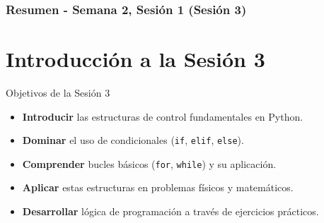 \documentclass[10pt]{beamer}
\begin{document}
\myfront{}

\begin{frame}[plain]
  \titlepage
\end{frame}

\begin{frame}
  \frametitle{Resumen - Semana 2, Sesión 1 (Sesión 3)}
  \tableofcontents
\end{frame}


\section{Introducción a la Sesión 3}

\begin{frame}{Objetivos de la Sesión 3}
  \begin{itemize}
    \item \textbf{Introducir} las estructuras de control fundamentales en Python.
    \item \textbf{Dominar} el uso de condicionales (\texttt{if}, \texttt{elif}, \texttt{else}).
    \item \textbf{Comprender} bucles básicos (\texttt{for}, \texttt{while}) y su aplicación.
    \item \textbf{Aplicar} estas estructuras en problemas físicos y matemáticos.
    \item \textbf{Desarrollar} lógica de programación a través de ejercicios prácticos.
  \end{itemize}
\end{frame}
\end{document}
